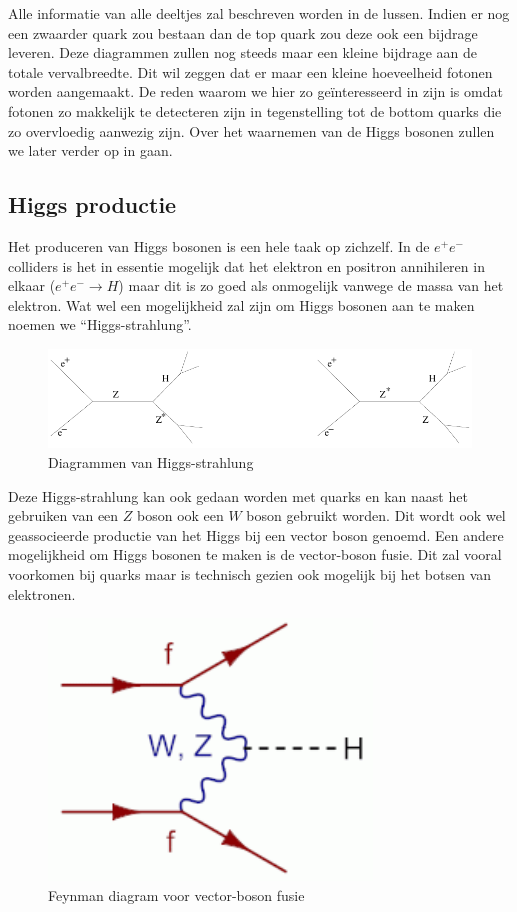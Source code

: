 \documentclass[../main.tex]{subfiles}
\begin{document}
Alle informatie van alle deeltjes zal beschreven worden in de lussen. Indien er nog een zwaarder quark zou bestaan dan de top quark zou deze ook een bijdrage leveren. Deze diagrammen zullen nog steeds maar een kleine bijdrage aan de totale vervalbreedte. Dit wil zeggen dat er maar een kleine hoeveelheid fotonen worden aangemaakt. De reden waarom we hier zo geïnteresseerd in zijn is omdat fotonen zo makkelijk te detecteren zijn in tegenstelling tot de bottom quarks die zo overvloedig aanwezig zijn. Over het waarnemen van de Higgs bosonen zullen we later verder op in gaan.

\subsection{Higgs productie}%
\label{sub:higgs_productie}

Het produceren van Higgs bosonen is een hele taak op zichzelf. In de $e^+e^-$ colliders is het in essentie mogelijk dat het elektron en positron annihileren in elkaar ($e^+e^-\rightarrow H$) maar dit is zo goed als onmogelijk vanwege de massa van het elektron. Wat wel een mogelijkheid zal zijn om Higgs bosonen aan te maken noemen we ``Higgs-strahlung''.

\begin{figure}[h]
    \centering
    \includegraphics[width=0.6\linewidth]{higgs_boson/Higgs_strahlung.png}
    \caption{Diagrammen van Higgs-strahlung}%
    \label{fig:higgs_boson/Higgs_strahlung}
\end{figure}

Deze Higgs-strahlung kan ook gedaan worden met quarks en kan naast het gebruiken van een $Z$ boson ook een $W$ boson gebruikt worden. Dit wordt ook wel geassocieerde productie van het Higgs bij een vector boson genoemd. Een andere mogelijkheid om Higgs bosonen te maken is de vector-boson fusie. Dit zal vooral voorkomen bij quarks maar is technisch gezien ook mogelijk bij het botsen van elektronen.

\begin{figure}[h]
    \centering
    \includegraphics[width=0.5\linewidth]{higgs_boson/vec_bos_fusie.png}
    \caption{Feynman diagram voor vector-boson fusie}%
    \label{fig:higgs_boson/vec_bos_fusie}
\end{figure}
\end{document}
